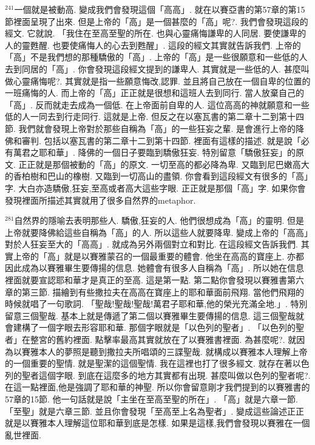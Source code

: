 \documentclass{book}
\begin{document}
$^{241}$一個就是被動高.
變成我們會發現這個「高高」.
就在以賽亞書的第57章的第15節裡面呈現了出來.
但是上帝的「高」是一個甚麼的「高」呢?.
我們會發現這段的經文.
它就說.
「我住在至高至聖的所在.
也與心靈痛悔謙卑的人同居.
要使謙卑的人的靈甦醒.
也要使痛悔人的心去到甦醒」.
這段的經文其實就告訴我們.
上帝的「高」不是我們想的那種驕傲的「高」.
上帝的「高」是一些很願意和一些低的人去到同居的「高」.
你會發現這段經文提到的謙卑人.
其實就是一些低的人.
甚麼叫做心靈痛悔呢?.
其實就是指一些願意悔改,認罪.
並且將自己放在一個自卑的位置的一班痛悔的人.
而上帝的「高」正正就是很想和這班人去到同行.
當人放棄自己的「高」.
反而就走去成為一個低.
在上帝面前自卑的人.
這位高高的神就願意和一些低的人一同去到行走同行.
這就是上帝.
但反之在以塞瓦書的第二章十二到第十四節.
我們就會發現上帝對於那些自稱為「高」的一些狂妄之輩.
是會進行上帝的降佛和審判.
包括以塞瓦書的第二章十二到第十四節.
裡面有這樣的描述.
就是說「必有萬君之耶和華」.
降佛的一個日子要臨到驕傲狂妄.
特別留意「驕傲狂妄」的原文.
正正就是那個被動的「高」的原文.
一切至高的都必降為卑.
又臨到尼巴嫩高大的香柏樹和巴山的橡樹.
又臨到一切高山的盡領.
你會看到這段經文有很多的「高」字.
大白亦造驕傲,狂妄,至高或者高大這些字眼.
正正就是那個「高」字.
如果你會發現裡面所描述其實就用了很多自然界的metaphor.

$^{281}$自然界的隱喻去表明那些人.
驕傲,狂妄的人.
他們很想成為「高」的靈明.
但是上帝就要降佛給這些自稱為「高」的人.
所以這些人就要降卑.
變成上帝的「高高」對於人狂妄至大的「高高」.
就成為另外兩個對立和對比.
在這段經文告訴我們.
其實上帝的「高」就是以賽雅蒙召的一個最重要的體會.
他坐在高高的寶座上.
亦都因此成為以賽雅畢生要傳揚的信息.
她體會有很多人自稱為「高」.
所以她在信息裡面就要宣認耶和華才是真正的至高.
這是第一點.
第二點你會發現以賽雅書第六章的第三節.
描繪到有些撒拉夫在高高在寶座上的耶和華面前飛翔.
當他們飛翔的時候就唱了一句歌詞.
「聖哉!聖哉!聖哉!萬君子耶和華,他的榮光充滿全地.」.
特別留意三個聖哉.
基本上就是傳遞了第二個以賽雅畢生要傳揚的信息.
這三個聖哉就會建構了一個字眼去形容耶和華.
那個字眼就是「以色列的聖者」.
「以色列的聖者」在整宮的舊約裡面.
點擊率最高其實就放在了以賽雅書裡面.
為甚麼呢?.
就因為以賽雅本人的夢照是聽到撒拉夫所唱頌的三諜聖哉.
就構成以賽雅本人理解上帝的一個重要的聖情.
就是聖潔的這個聖情.
我在這裡也打了很多經文.
就存在著以色列的聖者這個字眼.
到底在這麼多的地方其實都有出現.
甚麼叫做以色列的聖者呢?.
在這一點裡面,他是強調了耶和華的神聖.
所以你會留意剛才我們提到的以賽雅書的57章的15節.
他一句話就是說「主坐在至高至聖的所在」.
「高」就是六章一節.
「至聖」就是六章三節.
並且你會發現「至高至上名為聖者」.
變成這些論述正正就是以賽雅本人理解這位耶和華到底是怎樣.
如果是這樣,我們會發現以賽雅在一個亂世裡面.
\end{document}
